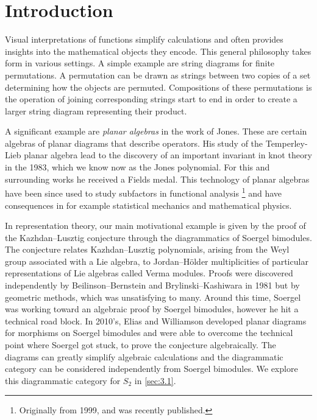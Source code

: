 \chapter{Introduction}

Visual interpretations of functions simplify calculations and often provides insights into the mathematical objects they encode.  This general philosophy takes form in various settings. A simple example are string diagrams for finite permutations. A permutation can be drawn as strings between two copies of a set determining how the objects are permuted. Compositions of these permutations is the operation of joining corresponding strings start to end in order to create a larger string diagram representing their product. 

A significant example are \textit{planar algebras} in the work of Jones. These are certain algebras of planar diagrams that describe operators. His study of the Temperley-Lieb planar algebra lead to the discovery of an important invariant in knot theory in the 1983, which we know now as the Jones polynomial. For this and surrounding works he received a Fields medal. This technology of planar algebras have been since used to study subfactors in functional analysis \cite{jones-planar-algebra}\footnote{Originally from 1999, and was recently published.} and have consequences in for example statistical mechanics and mathematical physics.

In representation theory, our main motivational example is given by the proof of the Kazhdan--Lusztig conjecture through the diagrammatics of Soergel bimodules. The conjecture relates Kazhdan--Lusztig polynomials, arising from the Weyl group associated with a Lie algebra, to Jordan--H\"older multiplicities of particular representations of Lie algebras called Verma modules. Proofs were discovered independently by Beilinson--Bernstein and Brylinski--Kashiwara in 1981 but by geometric methods, which was unsatisfying to many. Around this time, Soergel was working toward an algebraic proof by Soergel bimodules, however he hit a technical road block. In 2010's, Elias and Williamson  developed planar diagrams for morphisms on Soergel bimodules and were able to overcome the technical point where Soergel got stuck, to prove the conjecture algebraically. The diagrams can greatly simplify algebraic calculations and the diagrammatic category can be considered independently from Soergel bimodules. We explore this diagrammatic category for $S_2$ in \autoref{sec:3.1}.

